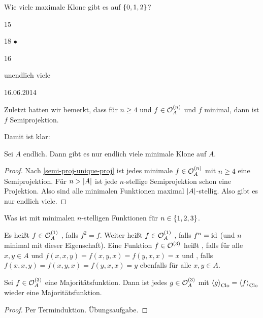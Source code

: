 \documentclass{book}
\begin{document}
\begin{exercise}
    Wie viele maximale Klone gibt es auf $\left\{0,1,2\right\}$?
    \begin{tasks}
            \item 15
            \item 18 $\bullet$
            \item 16
            \item unendlich viele
    \end{tasks}
\end{exercise}

\hfill{16.06.2014}

Zuletzt hatten wir bemerkt, dass für $n\geq 4$ und $f\in\mathcal{O}_A^{(n)}$ und $f$ minimal, dann ist $f$ Semiprojektion.

Damit ist klar:
\begin{corollary}
    Sei $A$ endlich. Dann gibt es nur endlich viele minimale Klone auf $A$.
\end{corollary}

\begin{proof}
    Nach \autoref{semi-proj-unique-proj} ist jedes minimale $f\in\mathcal{O}_A^{(n)}$ mit $n\geq 4$ eine Semiprojektion. Für $n>\left|A\right|$ ist jede $n$-stellige Semiprojektion schon eine Projektion. Also sind alle minimalen Funktionen maximal $\left|A\right|$-stellig. Also gibt es nur endlich viele.
\end{proof}

Was ist mit minimalen $n$-stelligen Funktionen für $n\in\left\{1,2,3\right\}$.

\begin{definition}
    Es heißt $f\in \mathcal{O}_A^{(1)}$ , falls $f^2=f$. Weiter heißt $f\in\mathcal{O}_A^{(1)}$ , falls $f^n=\mathop\mathrm{id}\nolimits$ (und $n$ minimal mit dieser Eigenschaft). Eine Funktion $f\in\mathcal{O}^{(3)}$ heißt , falls für alle $x,y\in A$ und $f(x,x,y)=f(x,y,x)=f(y,x,x)=x$ und , falls $f(x,x,y)=f(x,y,x)=f(y,x,x)=y$ ebenfalls für alle $x,y\in A$. 
\end{definition}

\begin{lemma}\label{class-gen-maj-fun}
    Sei $f\in\mathcal{O}_A^{(3)}$ eine Majoritätsfunktion. Dann ist jedes $g\in\mathcal{O}_A^{(3)}$ mit $\gen[\Clo]{g}=\gen[\Clo]{f}$ wieder eine Majoritätsfunktion. 
\end{lemma}

\begin{proof}
    Per Terminduktion. Übungsaufgabe.
\end{proof}
\end{document}
